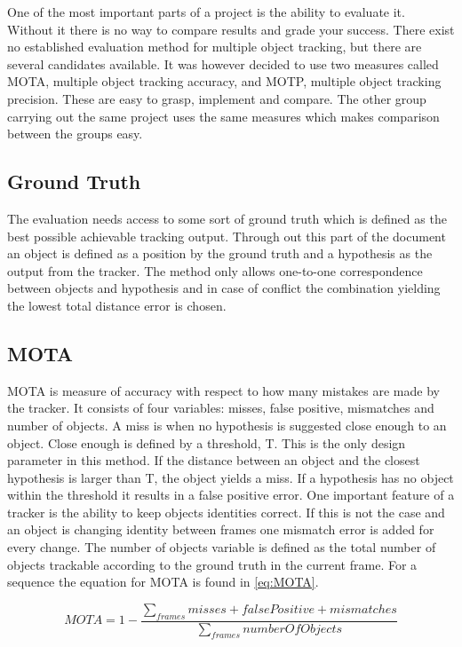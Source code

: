 One of the most important parts of a project is the ability to evaluate it. Without it there is no way to compare results and grade your success. There exist no established evaluation method for multiple object tracking, but there are several candidates available. It was however decided to use two measures called MOTA, multiple object tracking accuracy, and MOTP, multiple object tracking precision. These are easy to grasp, implement and compare. The other group carrying out the same project uses the same measures which makes comparison between the groups easy.

\subsection{Ground Truth}
The evaluation needs access to some sort of ground truth which is defined as the best possible achievable tracking output. Through out this part of the document an object is defined as a position by the ground truth and a hypothesis as the output from the tracker. The method only allows one-to-one correspondence between objects and hypothesis and in case of conflict the combination yielding the lowest total distance error is chosen.

\subsection{MOTA}
MOTA is measure of accuracy with respect to how many mistakes are made by the tracker. It consists of four variables: misses, false positive, mismatches and number of objects. A miss is when no hypothesis is suggested close enough to an object. Close enough is defined by a threshold, T. This is the only design parameter in this method. If the distance between an object and the closest hypothesis is larger than T, the object yields a miss. If a hypothesis has no object within the threshold it results in a false positive error. One important feature of a tracker is the ability to keep objects identities correct. If this is not the case and an object is changing identity between frames one mismatch error is added for every change. The number of objects variable is defined as the total number of objects trackable according to the ground truth in the current frame. For a sequence the equation for MOTA is found in \eqref{eq:MOTA}.

\begin{equation}
\label{eq:MOTA}
MOTA = 1 - \frac{\sum_{frames}{misses + false Positive + mismatches}}{\sum_{frames}{number Of Objects}}
\end{equation}	

